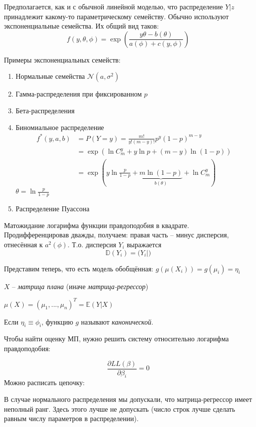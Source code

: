 \documentclass[main.tex]{subfiles}
\begin{document}
Предполагается, как и с обычной линейной моделью, что распределение $ Y|z $ принадлежит какому-то параметрическому семейству.
Обычно используют экспоненциальные семейства.
Их общий вид таков:
\[ f(y, \theta, \phi) = \exp \left( \frac{y \theta - b(\theta)}{ a(\phi) + c(y, \phi)  } \right) \] %

Примеры экспоненциальных семейств:
\begin{enumerate}[noitemsep]
	\item Нормальные семейства $ \mathcal N (a, \sigma^2) $
	\item Гамма-распределения при фиксированном $ p $
	\item Бета-распределения
	\item Биномиальное распределение
	\begin{align*}
		f^*(y, a, b) & = P(Y=y) = \frac{m!}{y!(m-y)!} p^y (1-p)^{m-y} \\
		& = \exp \left( \ln C_m^y + y \ln p + (m-y) \ln (1-p) \right) \\
		& = \exp \left( y \ln \frac{p}{1-p} + \underbrace{m \ln(1-p)}_{b(\theta)} + \ln C_m^y \right)
	\end{align*}
	$ \theta = \ln \frac{p}{1-p} $
	
	\item Распределение Пуассона
\end{enumerate}


Матожидание логарифма функции правдоподобия в квадрате.
Продифференцировав дважды, получаем: правая часть -- минус дисперсия, отнесённая к $ a^2(\phi) $.
Т.о. дисперсия  $ Y_i $ выражается
\[ \mathds D (Y_i) = \mathds (Y_i |) \] %

Представим теперь, что есть модель обобщённая: $ g(\mu(X_i)) = g(\mu_i) = \eta_i $

$ X $ --  \emph{матрица плана} (иначе \emph{матрица-регрессор}) 

$ \mu(X) = (\mu_1, ..., \mu_n)^T = \mathds E (Y|X) $

Если $ \eta_i \equiv \phi_i $, функцию $g$ называют \emph{канонической}.

Чтобы найти оценку МП, нужно решить систему относительно логарифма правдоподобия:

\[ \frac{\partial LL(\beta)}{ \partial \beta_i } = 0 \]
Можно расписать цепочку:


В случае нормального распределения мы допускали, что матрица-регрессор имеет неполный ранг.
Здесь этого лучше не допускать (число строк лучше сделать равным числу параметров в распределении).
\end{document}
